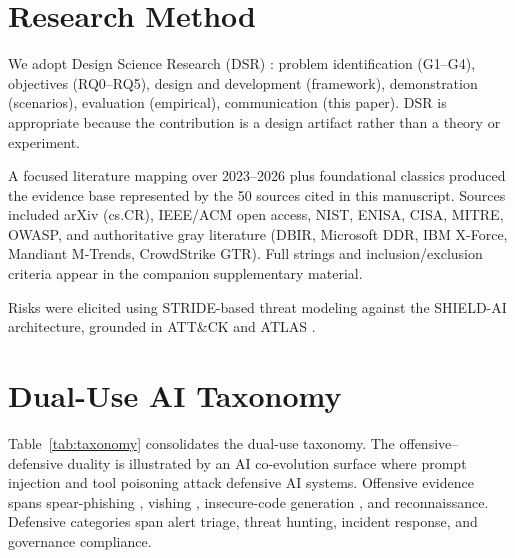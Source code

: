 \documentclass[journal]{IEEEtran}
\begin{document}
\section{Research Method}
\label{sec:method}

We adopt Design Science Research (DSR) \cite{hevner2004dsr,peffers2007dsrm}: problem
identification (G1--G4), objectives (RQ0--RQ5), design and development (framework),
demonstration (scenarios), evaluation (empirical), communication (this paper). DSR is
appropriate because the contribution is a design artifact rather than a theory or experiment.

A focused literature mapping over 2023--2026 plus foundational classics produced the evidence
base represented by the 50 sources cited in this manuscript. Sources included arXiv (cs.CR), IEEE/ACM open access, NIST,
ENISA, CISA, MITRE, OWASP, and authoritative gray literature (DBIR, Microsoft DDR, IBM X-Force,
Mandiant M-Trends, CrowdStrike GTR). Full strings and inclusion/exclusion criteria appear in
the companion supplementary material.

Risks were elicited using STRIDE-based threat modeling against the SHIELD-AI architecture,
grounded in ATT\&CK \cite{mitre2024attck} and ATLAS \cite{mitre2025atlas}.

\section{Dual-Use AI Taxonomy}
\label{sec:taxonomy}

Table~\ref{tab:taxonomy} consolidates the dual-use taxonomy. The offensive--defensive duality
is illustrated by an AI co-evolution surface where prompt injection
\cite{greshake2023indirect,liu2024formalizing} and tool poisoning \cite{owasp2025agentic}
attack defensive AI systems. Offensive evidence spans spear-phishing \cite{hazell2023spear},
vishing \cite{crowdstrike2025}, insecure-code generation \cite{bhatt2023cyberseceval}, and
reconnaissance. Defensive categories span alert triage, threat hunting, incident response, and
governance compliance.
\end{document}
